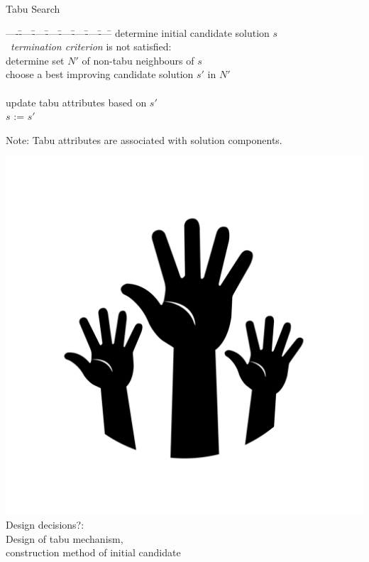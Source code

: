 \begin{frame}[c]{Tabu Search}

\begin{tabbing}
----\=----\=----\=----\=----\=----\=----\=----\=\kill
\> determine initial candidate solution $s$\\
\> \pscWhile\ \emph{termination criterion} is not satisfied:\\
\> \vbar \> determine set $N'$ of non-tabu neighbours of $s$\\[-0.55ex]
\> \vbar \> choose a best improving candidate solution $s'$ in $N'$\\[-0.55ex]
\> \vbar \\[-1.5ex]
\> \vbar \> update tabu attributes based on $s'$\\[-0.55ex]
\> \vend \> $s$ := $s'$ 
\end{tabbing}

Note: Tabu attributes are associated with solution components.

\medskip
\includegraphics[scale=.03]{images/hands.png}
\alert{Design decisions?}:\\
\pause Design of tabu mechanism,\\ 
construction method of initial candidate

\end{frame}
